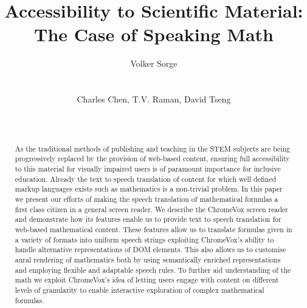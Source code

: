 \documentclass{sig-alternate}
\begin{document}
\title{Accessibility to Scientific Material:\\ The Case of Speaking Math}

\author{
%
%
  \alignauthor Volker Sorge\\
  \\
  \\
\alignauthor
Charles Chen, T.V. Raman, David Tseng\\
       \\
       \\
}


\maketitle 
\begin{abstract} 
  As the traditional methods of publishing and teaching in the STEM subjects are
  being progressively replaced by the provision of web-based content, ensuring
  full accessibility to this material for visually impaired users is of
  paramount importance for inclusive education. Already the text to speech
  translation of content for which well defined markup languages exists such as
  mathematics is a non-trivial problem. In this paper we present our efforts of
  making the speech translation of mathematical formulas a first class citizen
  in a general screen reader. We describe the ChromeVox screen reader and
  demonstrate how its features enable us to provide text to speech translation
  for web-based mathematical content. These features allow us to translate
  formulas given in a variety of formats into uniform speech strings exploiting
  ChromeVox's ability to handle alternative representations of DOM
  elements. This also allows us to customise aural rendering of mathematics both
  by using semantically enriched representations and employing flexible and
  adaptable speech rules. To further aid understanding of the math we exploit
  ChromeVox's idea of letting users engage with content on different levels of
  granularity to enable interactive exploration of complex mathematical
  formulas.
\end{abstract}
\end{document}
